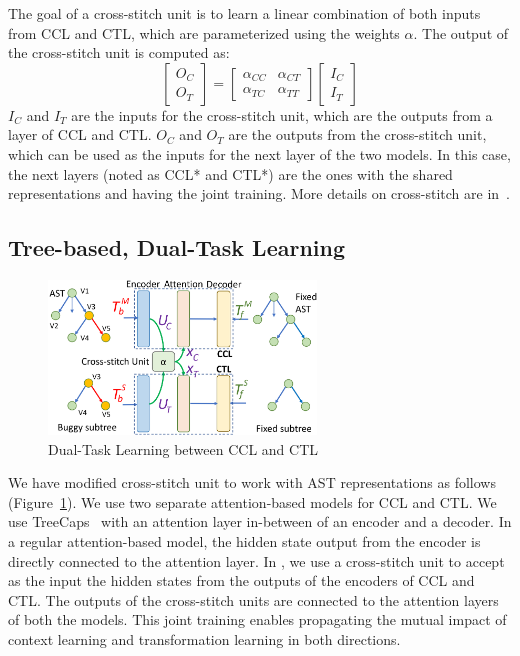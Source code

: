 The goal of a cross-stitch unit is to learn a linear combination of
both inputs from CCL and CTL, which are parameterized
using the weights $\alpha$. The output of the cross-stitch unit is
computed as:
\begin{equation}\label{eq:cross-stitch}
	\begin{bmatrix}
		O_C\\
		O_T
	\end{bmatrix}
	=
	\begin{bmatrix}
		\alpha_{CC} &  \alpha_{CT} \\
		\alpha_{TC} &  \alpha_{TT}
	\end{bmatrix}
	\begin{bmatrix}
		I_C\\
		I_T
	\end{bmatrix}
\end{equation}
$I_C$ and $I_T$ are the inputs for the cross-stitch unit, which are
the outputs from a layer of CCL and CTL. $O_C$ and $O_T$ are the
outputs from the cross-stitch unit, which can be used as the inputs
for the next layer of the two models. In this case, the next layers
(noted as CCL* and CTL*) are the ones with the shared representations
and having the joint training. More details on cross-stitch are
in~\cite{misra2016cross}.

\subsection{Tree-based, Dual-Task Learning}

\begin{figure}[t]
	\centering
	\includegraphics[width=2.8in]{graphs/dual-learning-repair-2.png}
        \vspace{-9pt}
	\caption{Dual-Task Learning between CCL and CTL}
	\label{fig:dual-learning}
\end{figure}

We have modified cross-stitch unit to work with AST representations as
follows (Figure~\ref{fig:dual-learning}). We use two separate
attention-based  models for CCL and CTL.
We use TreeCaps~\cite{bui2021treecaps} with an attention layer
in-between of an encoder and a decoder. In a regular attention-based
 model, the hidden state output from the encoder is
directly connected to the attention layer. In {\tool}, we use a
cross-stitch unit to accept as the input the hidden states from the
outputs of the encoders of CCL and CTL. The outputs of the
cross-stitch units are connected to the attention layers of both the
models. This joint training enables propagating the mutual impact of
context learning and transformation learning in both directions.

